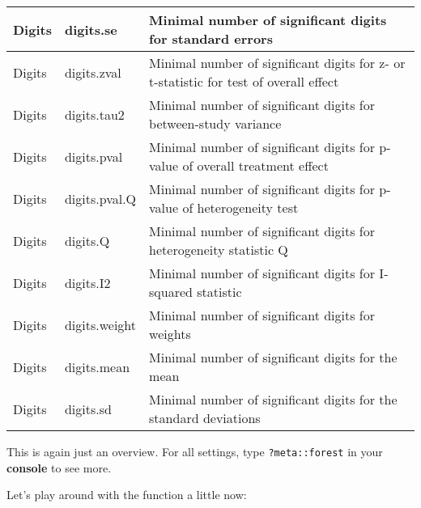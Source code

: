 \documentclass[]{book}
\newenvironment{Shaded}{\begin{snugshade}}{\end{snugshade}}
\newcommand{\KeywordTok}[1]{\textcolor[rgb]{0.13,0.29,0.53}{\textbf{#1}}}
\newcommand{\DataTypeTok}[1]{\textcolor[rgb]{0.13,0.29,0.53}{#1}}
\newcommand{\DecValTok}[1]{\textcolor[rgb]{0.00,0.00,0.81}{#1}}
\newcommand{\FloatTok}[1]{\textcolor[rgb]{0.00,0.00,0.81}{#1}}
\newcommand{\StringTok}[1]{\textcolor[rgb]{0.31,0.60,0.02}{#1}}
\newcommand{\OtherTok}[1]{\textcolor[rgb]{0.56,0.35,0.01}{#1}}
\newcommand{\OperatorTok}[1]{\textcolor[rgb]{0.81,0.36,0.00}{\textbf{#1}}}
\newcommand{\NormalTok}[1]{#1}
\theoremstyle{definition}
\theoremstyle{definition}
\theoremstyle{definition}
\theoremstyle{remark}
\begin{document}
\begin{tabular}{l|l|l}
\hline
Digits & digits.se & Minimal number of significant digits for standard errors\\
\hline
Digits & digits.zval & Minimal number of significant digits for z- or t-statistic for test of overall effect\\
\hline
Digits & digits.tau2 & Minimal number of significant digits for between-study variance\\
\hline
Digits & digits.pval & Minimal number of significant digits for p-value of overall treatment effect\\
\hline
Digits & digits.pval.Q & Minimal number of significant digits for p-value of heterogeneity test\\
\hline
Digits & digits.Q & Minimal number of significant digits for heterogeneity statistic Q\\
\hline
Digits & digits.I2 & Minimal number of significant digits for I-squared statistic\\
\hline
Digits & digits.weight & Minimal number of significant digits for weights\\
\hline
Digits & digits.mean & Minimal number of significant digits for the mean\\
\hline
Digits & digits.sd & Minimal number of significant digits for the standard deviations\\
\hline
\end{tabular}

This is again just an overview. For all settings, type
\texttt{?meta::forest} in your \textbf{console} to see more.

Let's play around with the function a little now:

\begin{Shaded}
\end{Shaded}
\end{document}
